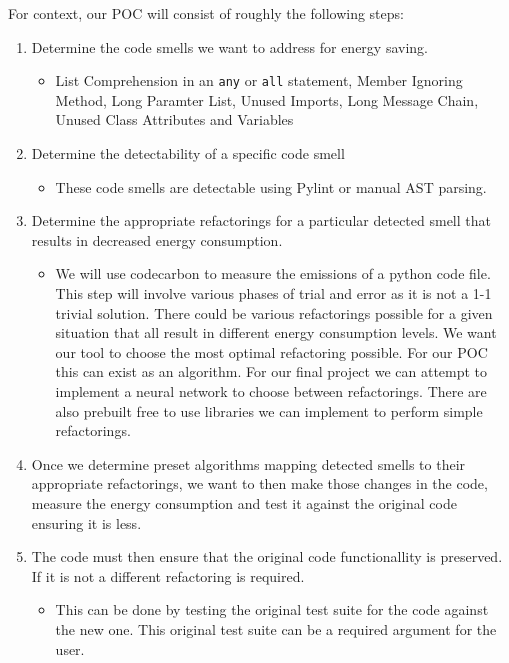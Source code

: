 \documentclass{article}
\begin{document}
For context, our POC will consist of roughly the following steps:
\begin{enumerate}
  \item Determine the code smells we want to address for energy saving.
  \begin{itemize}
    \item List Comprehension in an \texttt{any} or \texttt{all} statement, Member Ignoring Method, Long Paramter List, Unused Imports, Long Message Chain, Unused Class Attributes and Variables
  \end{itemize} 
  \item Determine the detectability of a specific code smell 
  \begin{itemize}
    \item These code smells are detectable using Pylint or manual AST parsing.
  \end{itemize} 
  \item Determine the appropriate refactorings for a particular detected smell that results in decreased energy consumption.
  \begin{itemize}
    \item We will use codecarbon to measure the emissions of a python code file. This step will involve various phases of trial and error as it is not a 1-1 trivial solution. There could be various refactorings possible for a given situation that all result in different energy consumption levels. We want our tool to choose the most optimal refactoring possible. For our POC this can exist as an algorithm. For our final project we can attempt to implement a neural network to choose between refactorings. There are also prebuilt free to use libraries we can implement to perform simple refactorings.
  \end{itemize} 
  \item Once we determine preset algorithms mapping detected smells to their appropriate refactorings, we want to then make those changes in the code, measure the energy consumption and test it against the original code ensuring it is less.
  \item The code must then ensure that the original code functionallity is preserved. If it is not a different refactoring is required. 
  \begin{itemize}
    \item This can be done by testing the original test suite for the code against the new one. This original test suite can be a required argument for the user.
  \end{itemize} 
\end{enumerate}
\end{document}
